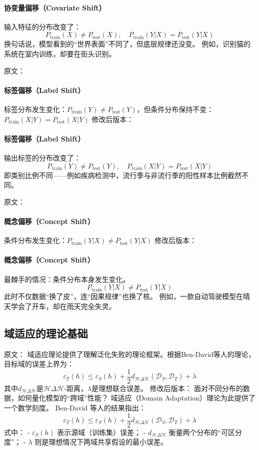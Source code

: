 \paragraph{协变量偏移（Covariate Shift）}  
输入特征的分布改变了：  
$$P_{\text{train}}(X) \neq P_{\text{test}}(X), \quad P_{\text{train}}(Y|X) = P_{\text{test}}(Y|X)$$  
换句话说，模型看到的“世界表面”不同了，但底层规律还没变。  
例如，识别猫的系统在室内训练，却要在街头识别。

原文：
\paragraph{标签偏移（Label Shift）}
标签分布发生变化：$P_{\text{train}}(Y) \neq P_{\text{test}}(Y)$，但条件分布保持不变：$P_{\text{train}}(X|Y) = P_{\text{test}}(X|Y)$
修改后版本：
\paragraph{标签偏移（Label Shift）}  
输出标签的分布改变了：  
$$P_{\text{train}}(Y) \neq P_{\text{test}}(Y), \quad P_{\text{train}}(X|Y) = P_{\text{test}}(X|Y)$$  
即类别比例不同——例如疾病检测中，流行季与非流行季的阳性样本比例截然不同。

原文：
\paragraph{概念偏移（Concept Shift）}
条件分布发生变化：$P_{\text{train}}(Y|X) \neq P_{\text{test}}(Y|X)$
修改后版本：
\paragraph{概念偏移（Concept Shift）}  
最棘手的情况：条件分布本身发生变化。  
$$P_{\text{train}}(Y|X) \neq P_{\text{test}}(Y|X)$$  
此时不仅数据“换了皮”，连“因果规律”也换了核。  
例如，一款自动驾驶模型在晴天学会了开车，却在雨天完全失灵。



\subsection{域适应的理论基础}

原文：
域适应理论提供了理解泛化失败的理论框架。根据Ben-David等人的理论，目标域的误差上界为：
$$\varepsilon_T(h) \leq \varepsilon_S(h) + \frac{1}{2}d_{\mathcal{H}\Delta\mathcal{H}}(\mathcal{D}_S, \mathcal{D}_T) + \lambda$$
其中$d_{\mathcal{H}\Delta\mathcal{H}}$是$\mathcal{H}\Delta\mathcal{H}$-距离，$\lambda$是理想联合误差。
修改后版本：
面对不同分布的数据，如何量化模型的“跨域”性能？  
域适应（Domain Adaptation）理论为此提供了一个数学刻度。  
Ben-David 等人的结果指出：  
$$\varepsilon_T(h) \leq \varepsilon_S(h) + \frac{1}{2}d_{\mathcal{H}\Delta\mathcal{H}}(\mathcal{D}_S, \mathcal{D}_T) + \lambda$$  
式中：  
- $\varepsilon_S(h)$ 表示源域（训练集）误差；  
- $d_{\mathcal{H}\Delta\mathcal{H}}$ 衡量两个分布的“可区分度”；  
- $\lambda$ 则是理想情况下两域共享假设的最小误差。  


